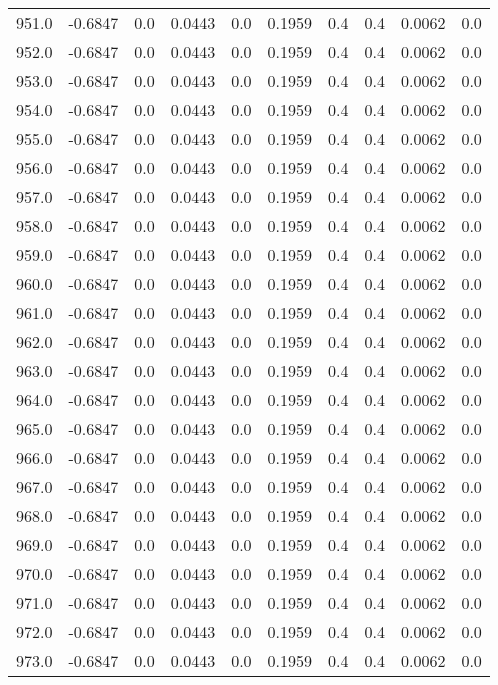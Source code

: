 \begin{longtable}{lrrrrrrrrr}
951.0 & -0.6847 & 0.0 & 0.0443 & 0.0 & 0.1959 & 0.4 & 0.4 & 0.0062 & 0.0 \\
952.0 & -0.6847 & 0.0 & 0.0443 & 0.0 & 0.1959 & 0.4 & 0.4 & 0.0062 & 0.0 \\
953.0 & -0.6847 & 0.0 & 0.0443 & 0.0 & 0.1959 & 0.4 & 0.4 & 0.0062 & 0.0 \\
954.0 & -0.6847 & 0.0 & 0.0443 & 0.0 & 0.1959 & 0.4 & 0.4 & 0.0062 & 0.0 \\
955.0 & -0.6847 & 0.0 & 0.0443 & 0.0 & 0.1959 & 0.4 & 0.4 & 0.0062 & 0.0 \\
956.0 & -0.6847 & 0.0 & 0.0443 & 0.0 & 0.1959 & 0.4 & 0.4 & 0.0062 & 0.0 \\
957.0 & -0.6847 & 0.0 & 0.0443 & 0.0 & 0.1959 & 0.4 & 0.4 & 0.0062 & 0.0 \\
958.0 & -0.6847 & 0.0 & 0.0443 & 0.0 & 0.1959 & 0.4 & 0.4 & 0.0062 & 0.0 \\
959.0 & -0.6847 & 0.0 & 0.0443 & 0.0 & 0.1959 & 0.4 & 0.4 & 0.0062 & 0.0 \\
960.0 & -0.6847 & 0.0 & 0.0443 & 0.0 & 0.1959 & 0.4 & 0.4 & 0.0062 & 0.0 \\
961.0 & -0.6847 & 0.0 & 0.0443 & 0.0 & 0.1959 & 0.4 & 0.4 & 0.0062 & 0.0 \\
962.0 & -0.6847 & 0.0 & 0.0443 & 0.0 & 0.1959 & 0.4 & 0.4 & 0.0062 & 0.0 \\
963.0 & -0.6847 & 0.0 & 0.0443 & 0.0 & 0.1959 & 0.4 & 0.4 & 0.0062 & 0.0 \\
964.0 & -0.6847 & 0.0 & 0.0443 & 0.0 & 0.1959 & 0.4 & 0.4 & 0.0062 & 0.0 \\
965.0 & -0.6847 & 0.0 & 0.0443 & 0.0 & 0.1959 & 0.4 & 0.4 & 0.0062 & 0.0 \\
966.0 & -0.6847 & 0.0 & 0.0443 & 0.0 & 0.1959 & 0.4 & 0.4 & 0.0062 & 0.0 \\
967.0 & -0.6847 & 0.0 & 0.0443 & 0.0 & 0.1959 & 0.4 & 0.4 & 0.0062 & 0.0 \\
968.0 & -0.6847 & 0.0 & 0.0443 & 0.0 & 0.1959 & 0.4 & 0.4 & 0.0062 & 0.0 \\
969.0 & -0.6847 & 0.0 & 0.0443 & 0.0 & 0.1959 & 0.4 & 0.4 & 0.0062 & 0.0 \\
970.0 & -0.6847 & 0.0 & 0.0443 & 0.0 & 0.1959 & 0.4 & 0.4 & 0.0062 & 0.0 \\
971.0 & -0.6847 & 0.0 & 0.0443 & 0.0 & 0.1959 & 0.4 & 0.4 & 0.0062 & 0.0 \\
972.0 & -0.6847 & 0.0 & 0.0443 & 0.0 & 0.1959 & 0.4 & 0.4 & 0.0062 & 0.0 \\
973.0 & -0.6847 & 0.0 & 0.0443 & 0.0 & 0.1959 & 0.4 & 0.4 & 0.0062 & 0.0 \\

\end{longtable}
